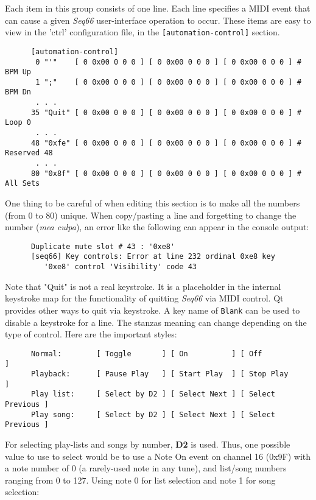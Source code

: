    Each item in this group consists of one line.  Each line
   specifies a MIDI event that can cause a given
   \textsl{Seq66} user-interface operation to occur.
   These items are easy to view in the 'ctrl' configuration file,
   in the \texttt{[automation-control]} section.

   \begin{verbatim}
      [automation-control]
       0 "'"    [ 0 0x00 0 0 0 ] [ 0 0x00 0 0 0 ] [ 0 0x00 0 0 0 ] # BPM Up
       1 ";"    [ 0 0x00 0 0 0 ] [ 0 0x00 0 0 0 ] [ 0 0x00 0 0 0 ] # BPM Dn
       . . .
      35 "Quit" [ 0 0x00 0 0 0 ] [ 0 0x00 0 0 0 ] [ 0 0x00 0 0 0 ] # Loop 0
       . . .
      48 "0xfe" [ 0 0x00 0 0 0 ] [ 0 0x00 0 0 0 ] [ 0 0x00 0 0 0 ] # Reserved 48
       . . .
      80 "0x8f" [ 0 0x00 0 0 0 ] [ 0 0x00 0 0 0 ] [ 0 0x00 0 0 0 ] # All Sets
   \end{verbatim}

   One thing to be careful of when editing this section is to make
   all the numbers (from 0 to 80) unique. When copy/pasting a line and
   forgetting to change the number (\textsl{mea culpa}),
   an error like the following can appear in the console output:

   \begin{verbatim}
      Duplicate mute slot # 43 : '0xe8'
      [seq66] Key controls: Error at line 232 ordinal 0xe8 key
         '0xe8' control 'Visibility' code 43
   \end{verbatim}

   Note that "Quit" is not a real keystroke.  It is a placeholder in the
   internal keystroke map for the functionality of quitting \textsl{Seq66} via
   MIDI control.  Qt provides other ways to quit via keystroke.  A key name of
   \texttt{Blank} can be used to disable a keystroke for a line.  The stanzas
   meaning can change depending on the type of control.  Here are
   the important styles:

   \begin{verbatim}
      Normal:        [ Toggle       ] [ On          ] [ Off             ]
      Playback:      [ Pause Play   ] [ Start Play  ] [ Stop Play       ]
      Play list:     [ Select by D2 ] [ Select Next ] [ Select Previous ]
      Play song:     [ Select by D2 ] [ Select Next ] [ Select Previous ]
   \end{verbatim}

   For selecting play-lists and songs by number, \textbf{D2} is used.
   Thus, one possible value to use to select would be to use a 
   Note On event on channel 16 (0x9F) with a note number of 0 (a rarely-used
   note in any tune), and list/song numbers ranging from 0 to 127.  Using note
   0 for list selection and note 1 for song selection:


